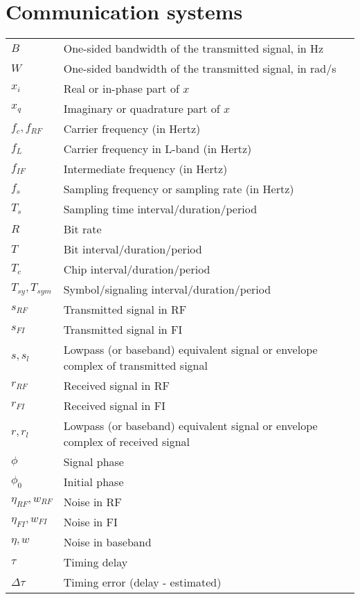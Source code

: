 \documentclass{article}
\begin{document}
\section{Communication systems}
\begin{xltabular}{\textwidth}{XX}
    \(B\) & One-sided bandwidth of the transmitted signal, in Hz\\
    \(W\) & One-sided bandwidth of the transmitted signal, in rad/s\\
    \(x_i\) & Real or in-phase part of \(x\)\\
    \(x_q\) & Imaginary or quadrature part of \(x\)\\
    \(f_c, f_{RF}\) & Carrier frequency (in Hertz)\\
    \(f_L\) & Carrier frequency in L-band (in Hertz)\\
    \(f_{IF}\) & Intermediate frequency (in Hertz)\\
    \(f_{s}\) & Sampling frequency or sampling rate (in Hertz)\\
    \(T_{s}\) & Sampling time interval/duration/period\\
    \(R\) & Bit rate\\
    \(T\) & Bit interval/duration/period\\
    \(T_c\) & Chip interval/duration/period\\
    \(T_{sy}, T_{sym}\) & Symbol/signaling\cite{proakisDigitalCommunications2007} interval/duration/period\\
    \(s_{RF}\) & Transmitted signal in RF\\
    \(s_{FI}\) & Transmitted signal in FI\\
    \(s, s_l\) & Lowpass (or baseband) equivalent signal or envelope complex of transmitted signal\\
    \(r_{RF}\) & Received signal in RF\\
    \(r_{FI}\) & Received signal in FI\\
    \(r, r_l\) & Lowpass (or baseband) equivalent signal or envelope complex of received signal\\
    \(\phi\) & Signal phase\\
    \(\phi_0\) & Initial phase\\
    \(\eta_{RF}, w_{RF}\) & Noise in RF\\
    \(\eta_{FI}, w_{FI}\) & Noise in FI\\
    \(\eta, w\) & Noise in baseband\\
    \(\tau\) & Timing delay \\
    \(\Delta\tau\) & Timing error (delay - estimated) \\

\end{xltabular}
\end{document}
